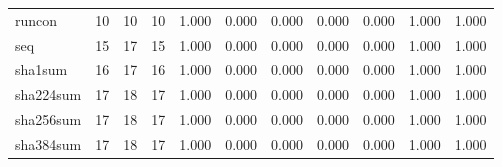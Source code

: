 \begin{longtable}{lp{1.8cm}p{1.8cm}p{1.8cm}p{1.8cm}p{1.8cm}p{1.8cm}p{1.8cm}p{1.8cm}p{1.8cm}p{1.8cm}}
runcon    &                           10 &                 10 &                                10 &                                      1.000 &                                  0.000 &                                        0.000 &                             0.000 &                                   0.000 &                              1.000 &                                              1.000 \\
seq       &                           15 &                 17 &                                15 &                                      1.000 &                                  0.000 &                                        0.000 &                             0.000 &                                   0.000 &                              1.000 &                                              1.000 \\
sha1sum   &                           16 &                 17 &                                16 &                                      1.000 &                                  0.000 &                                        0.000 &                             0.000 &                                   0.000 &                              1.000 &                                              1.000 \\
sha224sum &                           17 &                 18 &                                17 &                                      1.000 &                                  0.000 &                                        0.000 &                             0.000 &                                   0.000 &                              1.000 &                                              1.000 \\
sha256sum &                           17 &                 18 &                                17 &                                      1.000 &                                  0.000 &                                        0.000 &                             0.000 &                                   0.000 &                              1.000 &                                              1.000 \\
sha384sum &                           17 &                 18 &                                17 &                                      1.000 &                                  0.000 &                                        0.000 &                             0.000 &                                   0.000 &                              1.000 &                                              1.000 \\

\end{longtable}
